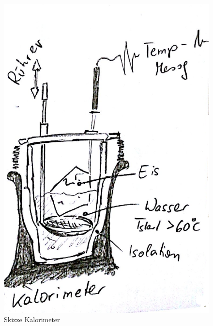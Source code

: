 \documentclass[12pt,a4paper]{article}
\begin{document}
\begin{multicols}{2}
\begin{figure}[H]
	\centering
	\includegraphics[scale=0.2]{./figure/kalorimeter.png}
	\caption{Skizze Kalorimeter}
	\label{fig:visko_kalorimeter}
\end{figure}


\end{multicols}
\end{document}
